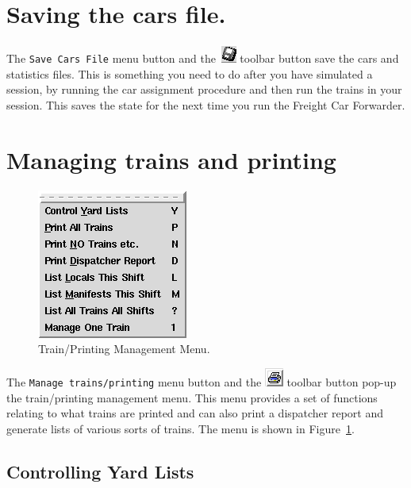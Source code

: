 \section{Saving the cars file.}

The \verb=Save Cars File= menu button and the \includegraphics{FCFSaveCarsTool.png} 
toolbar button save the cars and statistics files. This is something you
need to do after you have simulated a session, by running the car
assignment procedure and then run the trains in your session.  This
saves the state for the next time you run the Freight Car Forwarder.

\section{Managing trains and printing}
\begin{figure}[hbpt]
\begin{centering}
\includegraphics{FCFManageTrainsMenu.png}
\caption{Train/Printing Management Menu.}
\label{fig:fcf:FCFManageTrainsMenu}
\end{centering}
\end{figure}
The \verb=Manage trains/printing= menu button and the 
\includegraphics{FCFManageTrainsTool.png} toolbar button pop-up the
train/printing management menu.  This menu provides a set of functions
relating to what trains are printed and can also  print a dispatcher
report and generate lists of various sorts of trains.  The menu is shown
in  Figure~\ref{fig:fcf:FCFManageTrainsMenu}.

\subsection{Controlling Yard Lists}

